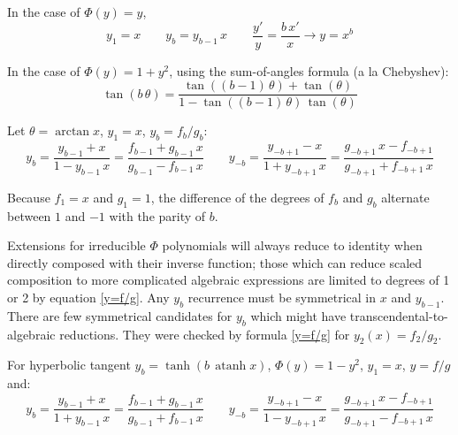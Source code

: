 \documentclass[10pt,letterpaper]{article}
\theoremstyle{proclaim}
\DeclareMathOperator{\atanh}{atanh}
\begin{document}
In the case of $\Phi(y)=y$,
\begin{equation}
y_1=x\qquad y_{b}=y_{b-1}\,x\qquad {\frac{y'}{ y}}={\frac{b\,x'}{ x}}\to y=x^b\label{log-y_b}
\end{equation}

In the case of $\Phi(y)=1+y^2$, using the sum-of-angles formula (a la
Chebyshev):
\begin{equation}
\tan(b\,\theta)={\frac{\tan((b-1)\,\theta)+\tan(\theta)}{1-\tan((b-1)\,\theta)\,\tan(\theta)}}\label{Chebyshev}
\end{equation}

Let $\theta=\arctan x$, $y_{1}=x$, $y_b=f_b/g_b$:
\begin{equation}
y_{b}={\frac{y_{b-1}+x}{1-y_{b-1}\,x}}=
  {\frac{f_{b-1}+g_{b-1}\,x}{ g_{b-1}-f_{b-1}\,x}}\qquad
  y_{-b}={\frac{y_{-b+1}-x}{1+y_{-b+1}\,x}}=
  {\frac{g_{-b+1}\,x-f_{-b+1}}{ g_{-b+1}+f_{-b+1}\,x}}\label{arctan-y_b}
\end{equation}

Because $f_{1}=x$ and $g_{1}=1$, the difference of the degrees of
$f_{b}$ and $g_{b}$ alternate between $1$ and $-1$ with the parity of
$b$.

Extensions for irreducible $\Phi$ polynomials will always reduce
to identity when directly composed with their inverse function; those
which can reduce scaled composition to more complicated algebraic
expressions are limited to degrees of 1 or 2 by
equation \eqref{y=f/g}.  Any $y_{b}$ recurrence must be symmetrical in
$x$ and $y_{b-1}$.  There are few symmetrical candidates for $y_{b}$
which might have transcendental-to-algebraic reductions.  They were
checked by formula \eqref{y=f/g} for $y_2(x)=f_2/g_2$.

For hyperbolic tangent $y_{b}=\tanh(b\,\atanh x)$, $\Phi(y)=1-y^2$, $y_{1}=x$, $y=f/g$ and:
\begin{equation}
y_{b}={\frac{y_{b-1}+x}{1+y_{b-1}\,x}}=
  {\frac{f_{b-1}+g_{b-1}\,x}{ g_{b-1}+f_{b-1}\,x}}\qquad
  y_{-b}={\frac{y_{-b+1}-x}{1-y_{-b+1}\,x}}=
  {\frac{g_{-b+1}\,x-f_{-b+1}}{ g_{-b+1}-f_{-b+1}\,x}}\label{arctanh-y_b}
\end{equation}
\end{document}
